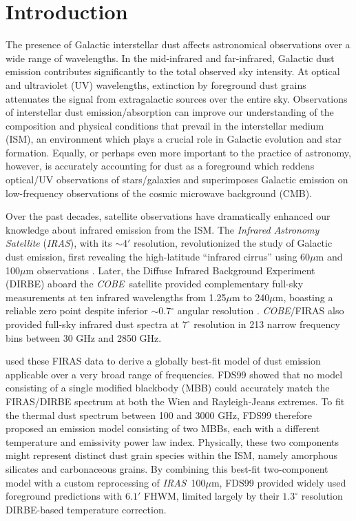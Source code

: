 \documentclass{emulateapj}
\newcommand{\IRAS}{{\it IRAS}}
\newcommand{\COBE}{{\it COBE}}
\begin{document}
\section{Introduction}
The presence of Galactic interstellar dust affects
astronomical observations over a wide range of wavelengths. In the mid-infrared
and far-infrared, Galactic dust emission contributes significantly
to the total observed sky intensity. At optical and ultraviolet (UV) 
wavelengths, extinction by foreground dust grains attenuates the signal from 
extragalactic sources over the entire sky. Observations of interstellar dust 
emission/absorption can improve our understanding of the composition and 
physical conditions that prevail in the interstellar medium (ISM), an 
environment which plays a crucial role in Galactic evolution and star 
formation. Equally, or perhaps even more important to the practice of 
astronomy, however, is accurately accounting for dust as a foreground which 
reddens optical/UV observations of stars/galaxies and superimposes Galactic 
emission on low-frequency observations of the cosmic microwave background 
(CMB). 

Over the past decades, satellite observations have dramatically enhanced our
knowledge about infrared emission from the ISM. The \textit{Infrared Astronomy 
Satellite} (\IRAS), with its $\sim$4$'$ resolution, revolutionized the study of
 Galactic dust emission, first revealing the high-latitude ``infrared cirrus'' 
using 60$\mu$m and 100$\mu$m observations \citep{low84, wheelock94}. Later, the
Diffuse Infrared Background Experiment (DIRBE) aboard the \COBE~satellite 
provided complementary full-sky measurements at ten infrared wavelengths from 
1.25$\mu$m to 240$\mu$m, boasting a reliable zero point despite inferior 
$\sim$0.7$^{\circ}$ angular resolution \citep{boggess92}. \COBE/FIRAS 
\citep{firas} also provided full-sky infrared dust spectra at $7^{\circ}$ 
resolution in 213 narrow frequency bins between 30 GHz and 2850 GHz.


\citet[hereafter FDS99]{FDS99} used these FIRAS data to derive a globally 
best-fit model of dust emission applicable over a very broad range of 
frequencies. FDS99 showed that no model consisting of a single modified 
blackbody (MBB) could accurately match the FIRAS/DIRBE spectrum at both the 
Wien and Rayleigh-Jeans extremes. To fit the thermal dust spectrum between 100 
and 3000 GHz, FDS99 therefore proposed an emission model consisting of two 
MBBs, each with a different temperature and emissivity power law index. 
Physically, these two components might represent distinct dust grain species 
within the ISM, namely amorphous silicates and carbonaceous grains. By 
combining this best-fit two-component model with a custom reprocessing of 
\IRAS~100$\mu$m, FDS99 provided widely used foreground predictions with 
$6.1'$ FHWM, limited largely by their $1.3^{\circ}$ resolution DIRBE-based 
temperature correction.
\end{document}
